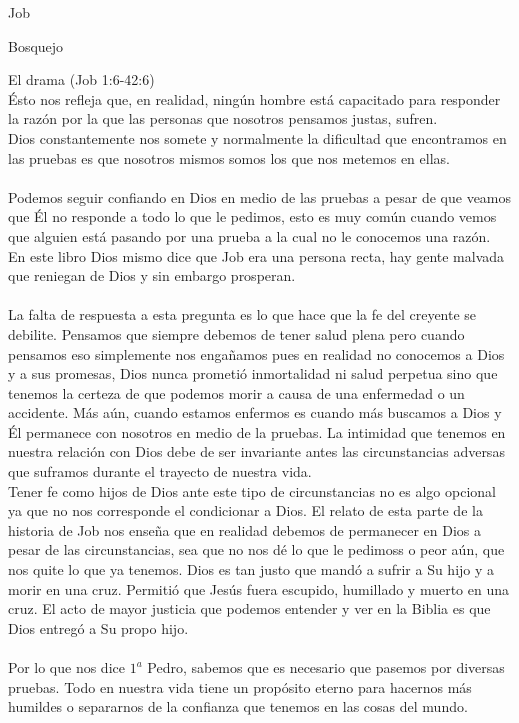 \begin{section}{Job}
\begin{subsection}{Bosquejo}
\begin{subsubsection}{El drama (Job 1:6-42:6)}
\\
Ésto nos refleja que, en realidad, ningún hombre está capacitado para responder la razón por la que las personas que nosotros pensamos justas, sufren.\\
Dios constantemente nos somete y normalmente la dificultad que encontramos en las pruebas es que nosotros mismos somos los que nos metemos en ellas.\\
\\
Podemos seguir confiando en Dios en medio de las pruebas a pesar de que veamos que Él no responde a todo lo que le pedimos, esto es muy común cuando vemos que alguien está pasando por una prueba a la cual no le conocemos una razón.\\
En este libro Dios mismo dice que Job era una persona recta, hay gente malvada que reniegan de Dios y sin embargo prosperan.\\
\\ 
La falta de respuesta a esta pregunta es lo que hace que la fe del creyente se debilite. Pensamos que siempre debemos de tener salud plena pero cuando pensamos eso simplemente nos engañamos pues en realidad no conocemos a Dios y a sus promesas, Dios nunca prometió inmortalidad ni salud perpetua sino que tenemos la certeza de que podemos morir a causa de una enfermedad o un accidente. Más aún, cuando estamos enfermos es cuando más buscamos a Dios y Él permanece con nosotros en medio de la pruebas. La intimidad que tenemos en nuestra relación con Dios debe de ser invariante antes las circunstancias adversas que suframos durante el trayecto de nuestra vida.\\
Tener fe como hijos de Dios ante este tipo de circunstancias no es algo opcional ya que no nos corresponde el condicionar a Dios.
\newpage
El relato de esta parte de la historia de Job nos enseña que en realidad debemos de permanecer en Dios a pesar de las circunstancias, sea que no nos dé lo que le pedimoss o peor aún, que nos quite lo que ya tenemos. Dios es tan justo que mandó a sufrir a Su hijo y a morir en una cruz. Permitió que Jesús fuera escupido, humillado y muerto en una cruz. El acto de mayor justicia que podemos entender y ver en la Biblia es que Dios entregó a Su propo hijo.\\
\\
Por lo que nos dice $1^{a}$ Pedro, sabemos que es necesario que pasemos por diversas pruebas. Todo en nuestra vida tiene un propósito eterno para hacernos más humildes o separarnos de la confianza que tenemos en las cosas del mundo.\\ 

\end{subsubsection}
\end{subsection}
\end{section}
